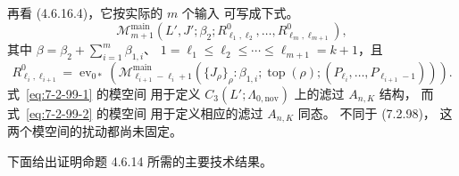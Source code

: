 再看 (4.6.16.4)，它按实际的 $m$ 个输入
可写成下式。%
\begin{equation}
\mathcal M^{\mathrm{main}}_{m+1}
(L',J';\beta_2;
R^0_{\ell_1,\ell_2},\ldots,
R^0_{\ell_m,\ell_{m+1}}),
\tag{7.2.99.1}\label{eq:7-2-99-1}
\end{equation}
其中
$\beta=\beta_2+\sum_{i=1}^{m}\beta_{1,i}$、
$1=\ell_1\le\ell_2\le\cdots\le\ell_{m+1}=k+1$，且
\begin{equation}
R^0_{\ell_i,\ell_{i+1}}
=\operatorname{ev}_{0*}\left(
\mathcal M^{\mathrm{main}}_{\ell_{i+1}-\ell_i+1}
(\{J_\rho\}_\rho:\beta_{1,i};
\operatorname{top}(\rho);
(P_{\ell_i},\ldots,P_{\ell_{i+1}-1}))
\right).
\tag{7.2.99.2}\label{eq:7-2-99-2}
\end{equation}
式~\eqref{eq:7-2-99-1} 的模空间
用于定义 $C_3(L';\Lambda_{0,\mathrm{nov}})$
上的滤过 $A_{n,K}$ 结构，
而式~\eqref{eq:7-2-99-2} 的模空间
用于定义相应的滤过 $A_{n,K}$ 同态。
不同于 (7.2.98)，
这两个模空间的扰动都尚未固定。

下面给出证明命题 4.6.14
所需的主要技术结果。

